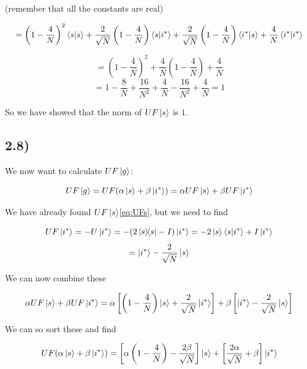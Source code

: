 \documentclass[a4paper,norsk, 10pt]{article}
\begin{document}
(remember that all the constants are real)

\begin{equation}
= \left(1 - \frac{4}{N}\right)^2\braket{s}{s} +\frac{2}{\sqrt{N}} \left(1 - \frac{4}{N}\right)\bra{s}\ket{i^*} + \frac{2}{\sqrt{N}} \left(1 - \frac{4}{N}\right)\bra{i^*}\ket{s} + \frac{4}{N}\braket{i^*}{i^*}
\end{equation}

\begin{equation}
= \left(1 - \frac{4}{N}\right)^2 + \frac{4}{N}\left(1 - \frac{4}{N}\right) + \frac{4}{N}
\end{equation}
\begin{equation}
= 1 - \frac{8}{N} + \frac{16}{N^2} + \frac{4}{N} - \frac{16}{N^2} + \frac{4}{N} = 1
\end{equation}


So we have showed that the norm of $UF\ket{s}$ is $1$.


\subsection{2.8)}

We now want to calculate $UF\ket{g}$:

\begin{equation}
UF\ket{g} = UF(\alpha\ket{s} + \beta\ket{i^*}) = \alpha UF\ket{s} + \beta UF\ket{i^*}
\end{equation}

We have already found $UF\ket{s}$\eqref{eq:UFs}, but we need to find

\begin{equation}
UF\ket{i^*} = -U\ket{i^*} = -(2\ketbra{s}{s} - I)\ket{i^*} = -2\ket{s}\braket{s}{i^*} + I\ket{i^*}
\end{equation}
\begin{equation}
= \ket{i^*} - \frac{2}{\sqrt{N}}\ket{s}
\end{equation}


We can now combine these

\begin{equation}
\alpha UF\ket{s} + \beta UF\ket{i^*} = \alpha\left[\left(1 - \frac{4}{N}\right)\ket{s} + \frac{2}{\sqrt{N}}\ket{i^*} \right] + \beta\left[\ket{i^*} - \frac{2}{\sqrt{N}}\ket{s}\right]
\end{equation}

We can so sort these and find 

\begin{equation}
UF(\alpha\ket{s} + \beta\ket{i^*}) = \left[\alpha\left(1 - \frac{4}{N}\right) - \frac{2\beta}{\sqrt{N}}\right]\ket{s} + \left[\frac{2\alpha}{\sqrt{N}} + \beta\right]\ket{i^*}
\end{equation}\label{eq:UFg}
\end{document}
